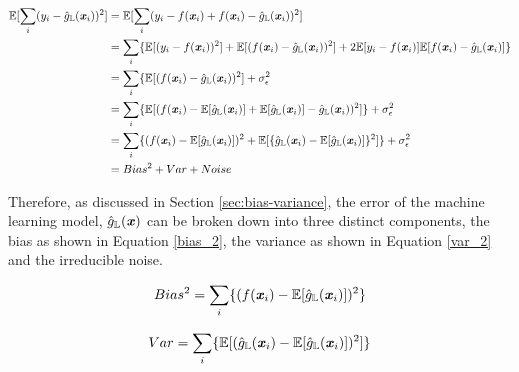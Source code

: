 \documentclass[../SMLreport_template.tex]{subfiles}
\begin{document}
\begin{equation} \label{bias_variance_decomp}
\begin{split}
    \mathbb{E}[\sum_{i}(y_i-\hat{g}_\mathbb{L}(\textbf{\textit{x}}_i))^2] &= \mathbb{E}[\sum_{i}(y_i-f(\textbf{\textit{x}}_i)+f(\textbf{\textit{x}}_i)-\hat{g}_\mathbb{L}(\textbf{\textit{x}}_i))^2]\\
    &= \sum_{i}\{\mathbb{E}[(y_i - f(\textbf{\textit{x}}_i))^2] + \mathbb{E}[(f(\textbf{\textit{x}}_i)-\hat{g}_\mathbb{L}(\textbf{\textit{x}}_i))^2] + 2\mathbb{E}[y_i - f(\textbf{\textit{x}}_i)]\mathbb{E}[f(\textbf{\textit{x}}_i)-\hat{g}_\mathbb{L}(\textbf{\textit{x}}_i)] \}\\
    &= \sum_{i}\{\mathbb{E}[(f(\textbf{\textit{x}}_i)-\hat{g}_\mathbb{L}(\textbf{\textit{x}}_i))^2] + \sigma_\epsilon^2 \\
    &=\sum_{i}\{\mathbb{E}[(f(\textbf{\textit{x}}_i)- \mathbb{E}[\hat{g}_\mathbb{L}(\textbf{\textit{x}}_i)] + \mathbb{E}[\hat{g}_\mathbb{L}(\textbf{\textit{x}}_i)]-\hat{g}_\mathbb{L}(\textbf{\textit{x}}_i))^2]\} + \sigma_\epsilon^2 \\
    &=\sum_{i}\{(f(\textbf{\textit{x}}_i)-\mathbb{E}[\hat{g}_\mathbb{L}(\textbf{\textit{x}}_i)])^2 + \mathbb{E}[\{\hat{g}_\mathbb{L}(\textbf{\textit{x}}_i)-\mathbb{E}[\hat{g}_\mathbb{L}(\textbf{\textit{x}}_i)]\}^2]\} + \sigma_\epsilon^2 \\
    &= Bias^2 + Var + Noise
\end{split}
\end{equation}

Therefore, as discussed in Section \ref{sec:bias-variance}, the error of the machine learning model,  \(\hat{g}_\mathbb{L}(\textbf{\textit{x}})\) can be broken down into three distinct  components, the bias as shown in Equation \ref{bias_2}, the variance as shown in Equation \ref{var_2} and the irreducible noise.   

\begin{equation} \label{bias_2}
Bias^2 = \sum_{i}\{(f(\textbf{\textit{x}}_i)-\mathbb{E}[\hat{g}_\mathbb{L}(\textbf{\textit{x}}_i)])^2\}
\end{equation}

\begin{equation} \label{var_2}
Var = \sum_{i}\{\mathbb{E}[(\hat{g}_\mathbb{L}(\textbf{\textit{x}}_i)-\mathbb{E}[\hat{g}_\mathbb{L}(\textbf{\textit{x}}_i)])^2]\}
\end{equation}
\end{document}
